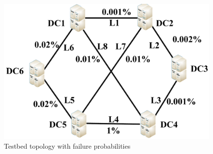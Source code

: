 \documentclass[sigconf]{acmart}
\begin{document}
 \begin{figure}[t]
\begin{center}
\includegraphics [width=0.6\columnwidth] {fig/testbed.pdf}
\caption{Testbed topology with failure probabilities}
\label{testbed}
\end{center}
\end{figure}
%
%
%
%
%
\end{document}
